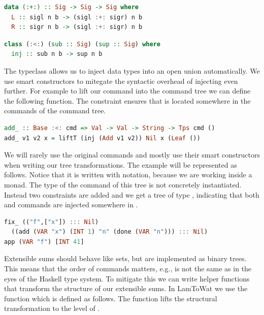 \begin{lstlisting}[language=Haskell]
data (:+:) :: Sig -> Sig -> Sig where
  L :: sigl n b -> (sigl :+: sigr) n b
  R :: sigr n b -> (sigl :+: sigr) n b
\end{lstlisting}

\begin{lstlisting}[language=Haskell]
class (:<:) (sub :: Sig) (sup :: Sig) where
  inj :: sub n b -> sup n b
\end{lstlisting}

The typeclass \icode{:<:} allows us to inject data types into an open union automatically. We use smart constructors to mitegate the syntactic overhead of injecting \autocite{DBLP:conf/haskell/WuSH14, DBLP:conf/popl/LiangHJ95} even further. For example to lift our  command into the command tree we can define the following function. The constraint  ensures that  is located somewhere in the commands of the command tree.

\begin{lstlisting}[language=Haskell]
add_ :: Base :<: cmd => Val -> Val -> String -> Tps cmd ()
add_ v1 v2 x = liftT (inj (Add v1 v2)) Nil x (Leaf ())
\end{lstlisting}

We will rarely use the original commands and mostly use their smart constructors when writing our tree transformations. The  example will be represented as follows. Notice that it is written with  notation, because we are working inside a monad. The type of the command of this tree is not concretely instantiated. Instead two constraints are added and we get a tree of type , indicating that both  and  commands are injected somewhere in .

\begin{lstlisting}[language=Haskell]
fix_ (("f",["x"]) ::: Nil)
  ((add (VAR "x") (INT 1) "n" (done (VAR "n"))) ::: Nil)
app (VAR "f") [INT 41]
\end{lstlisting}

Extensible sums should behave like sets, but are implemented as binary trees. This means that the order of commands matters, e.g.,  is not the same as  in the eyes of the Haskell type system. To mitigate this we can write helper functions that transform the structure of our extensible sums. In LamToWat we use the  function which is defined as follows. The  function lifts the structural transformation to the level of .

